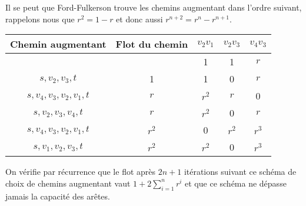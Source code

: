 \begin{solution}
\begin{itemize}
      Il se peut que Ford-Fulkerson
      trouve les chemins augmentant dans l'ordre suivant,
      rappelons nous que $r^2 = 1 - r$ et donc aussi $r^{n+2} = r^n - r^{n+1}$.
      \begin{center}
        \begin{tabular}{|c|c|c|c|c|}
          \hline
          Chemin augmentant & Flot du chemin & $v_2v_1$ & $v_2v_3$ & $v_4v_3$\\
          \hline
          & & 1 & 1 & $r$\\
          \hline
          $s, v_2, v_3, t$ & 1 & 1 & 0 & $r$\\
          \hline
          $s, v_4, v_3, v_2, v_1, t$ & $r$ & $r^2$ & $r$ & 0\\
          \hline
          $s, v_2, v_3, v_4, t$ & $r$ & $r^2$ & 0 & $r$\\
          \hline
          $s, v_4, v_3, v_2, v_1, t$ & $r^2$ & 0 & $r^2$ & $r^3$\\
          \hline
          $s, v_1, v_2, v_3, t$ & $r^2$ & $r^2$ & 0 & $r^3$\\
          \hline
        \end{tabular}
      \end{center}
      On vérifie par récurrence que le flot après $2n+1$ itérations suivant
      ce schéma de choix de chemins augmentant vaut $1 + 2\sum_{i=1}^n r^i$
      et que ce schéma ne dépasse jamais la capacité des arêtes.


\end{itemize}
\end{solution}
